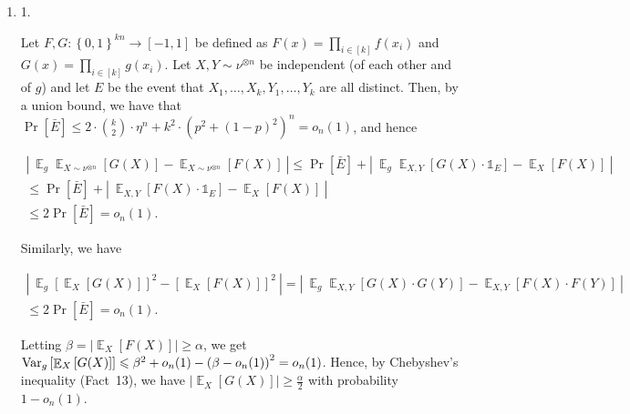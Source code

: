 \begin{enumerate}


\item[] 
1. 


Let $F,G:\left\{0,1\right\}^{kn}\to[-1,1]$ be defined as $F(x)=\prod_{i\in[k]}f\left(x_{i}\right)$ and $G(x)=\prod_{i\in[k]}g\left(x_{i}\right)$.
Let $X,Y\sim\nu^{\otimes n}$ be independent (of each other and of $g$) and let $E$ be the event that $X_{1},\dots,X_{k},Y_{1},\dots,Y_{k}$ are all distinct.
Then, by a union bound, we have that $\Pr\left[\bar{E}\right]\leqslant 2\cdot\binom{k}{2}\cdot\eta^{n}+k^{2}\cdot\left(p^{2}+\left(1-p\right)^{2}\right)^{n}=o_{n}(1)$, and hence\par




\[\begin{gathered}
\displaystyle\left|\ \mathop{\mathbb{E}}_{g}\mathop{\mathbb{E}}_{X\sim\nu^{\otimes n}}\left[G(X)\right]-\mathop{\mathbb{E}}_{X\sim\nu^{\otimes n}}\left[F(X)\right]\ \right| \displaystyle\leqslant\Pr\left[\bar{E}\right]+\left|\ \mathop{\mathbb{E}}_{g}\mathop{\mathbb{E}}_{X,Y}\left[G(X)\cdot\mathds{1}_{E}\right]-\mathop{\mathbb{E}}_{X}\left[F(X)\right]\ \right| \\
\displaystyle\leqslant\Pr\left[\bar{E}\right]+\left|\ \mathop{\mathbb{E}}_{X,Y}\left[F(X)\cdot\mathds{1}_{E}\right]-\mathop{\mathbb{E}}_{X}\left[F(X)\right]\ \right| \\
\displaystyle\leqslant 2\Pr\left[\bar{E}\right]=o_{n}(1).
\end{gathered}\]


Similarly, we have\par


\[\begin{gathered}
\displaystyle\left|\ \mathop{\mathbb{E}}_{g}\left[\mathop{\mathbb{E}}_{X}\left[G(X)\right]\right]^{2}-\left[\mathop{\mathbb{E}}_{X}\left[F(X)\right]\right]^{2}\ \right| \displaystyle=\left|\ \mathop{\mathbb{E}}_{g}\mathop{\mathbb{E}}_{X,Y}\left[G(X)\cdot G(Y)\right]-\mathop{\mathbb{E}}_{X,Y}\left[F(X)\cdot F(Y)\right]\ \right| \\
\displaystyle\leqslant 2\Pr\left[\bar{E}\right]=o_{n}(1).
\end{gathered}\]




Letting $\beta=\left|\mathop{\mathbb{E}}_{X}\left[F(X)\right]\right|\geqslant\alpha$, we get
$\textnormal{Var}_{g}\left[\mathop{\mathbb{E}}_{X}\left[G(X)\right]\right]\leqslant\beta^{2}+o_{n}(1)-\left(\beta-o_{n}(1)\right)^{2}=o_{n}(1)$.
Hence, by Chebyshev’s inequality (Fact 13), we have $\left|\mathop{\mathbb{E}}_{X}\left[G(X)\right]\right|\geqslant\frac{\alpha}{2}$ with probability $1-o_{n}(1)$.\par






\end{enumerate}
